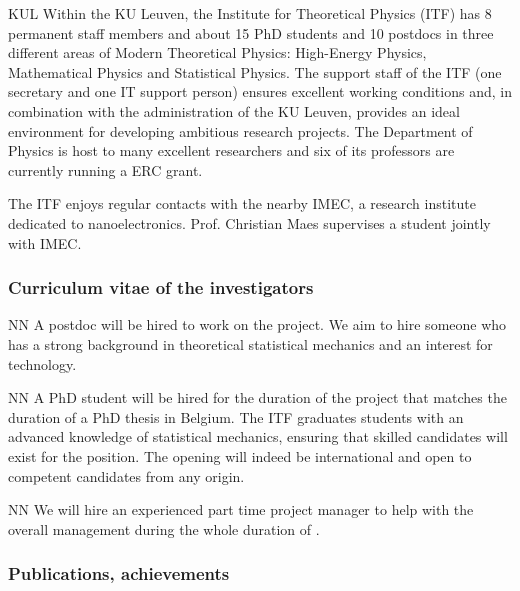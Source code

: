 \begin{sitedescription}{KUL}
Within the KU Leuven, the Institute for Theoretical Physics (ITF) has 8 permanent staff
members and about 15 PhD students and 10 postdocs in three different areas of Modern
Theoretical Physics: High-Energy Physics, Mathematical Physics and Statistical Physics.
%
The support staff of the ITF (one secretary and one IT support person) ensures excellent
working conditions and, in combination with the administration of the KU Leuven, provides an
ideal environment for developing ambitious research projects.
%
The Department of Physics is host to many excellent researchers and six of its professors
are currently running a ERC grant.

The ITF enjoys regular contacts with the nearby IMEC, a research institute dedicated to
nanoelectronics. Prof. Christian Maes supervises a student jointly with IMEC.

\subsubsection*{Curriculum vitae of the investigators}




\begin{participant}[type=res,PM=48,salary=5500]{NN}
A postdoc will be hired to work on the project. We aim to hire someone who has a strong
background in theoretical statistical mechanics and an interest for technology.
\end{participant}

\begin{participant}[type=res,PM=48,salary=3500]{NN}
A PhD student will be hired for the duration of the project that matches the duration of a
PhD thesis in Belgium. The ITF graduates students with an advanced knowledge of statistical
mechanics, ensuring that skilled candidates will exist for the position.
%
The opening will indeed be international and open to competent candidates from any
origin.
\end{participant}

\begin{participant}[type=res,PM=24,salary=3932]{NN}
We will hire an experienced part time project manager to help with the overall management
during the whole duration of \TheProject.
\end{participant}

\subsubsection*{Publications, achievements}


\end{sitedescription}

